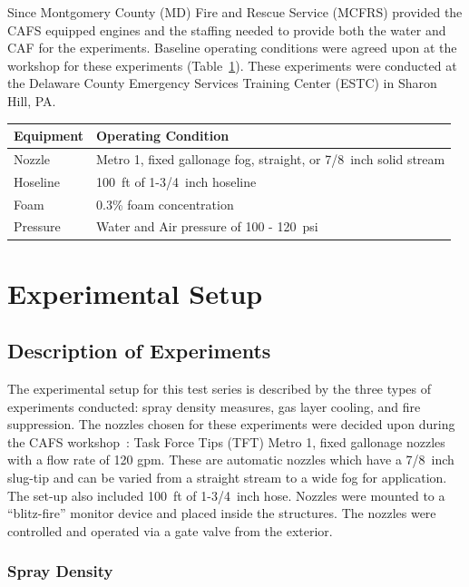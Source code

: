 \documentclass[12pt,oneside]{book}
\begin{document}
Since Montgomery County (MD) Fire and Rescue Service (MCFRS) provided the CAFS equipped engines and the staffing needed to provide both the water and CAF for the experiments. Baseline operating conditions were agreed upon at the workshop for these experiments (Table~\ref{tab:op_condition}). These experiments were conducted at the Delaware County Emergency Services Training Center (ESTC) in Sharon Hill, PA.

\begin{table}[!ht]
\centering
{}\label{tab:op_condition}
\begin{tabular}{ll}
\toprule[1.5pt]
Equipment    &   Operating Condition \\
\midrule
Nozzle       & Metro 1, fixed gallonage fog, straight, or 7/8~inch solid stream \\
Hoseline     & 100~ft of 1-3/4~inch hoseline \\
Foam         & 0.3\% foam concentration \\
Pressure     & Water and Air pressure of 100 - 120~psi \\
\bottomrule[1.25pt]
\end{tabular}\par
\end{table}


\chapter{Experimental Setup}

\section{Description of Experiments}
\label{sec:desc_experiments}
The experimental setup for this test series is described by the three types of experiments conducted: spray density measures, gas layer cooling, and fire suppression. The nozzles chosen for these experiments were decided upon during the CAFS workshop~\cite{Grant:2011}: Task Force Tips (TFT) Metro 1, fixed gallonage nozzles with a flow rate of 120 gpm. These are automatic nozzles which have a 7/8~inch slug-tip and can be varied from a straight stream to a wide fog for application. The set-up also included 100~ft of 1-3/4~inch hose. Nozzles were mounted to a ``blitz-fire'' monitor device and placed inside the structures. The nozzles were controlled and operated via a gate valve from the exterior.

\subsection{Spray Density}
\label{sec:desc_Spray_Density}
\end{document}

